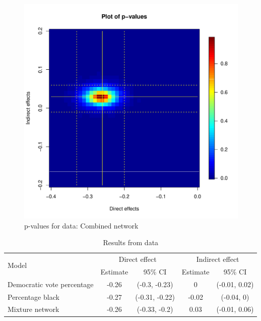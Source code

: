\documentclass[12pt]{article}
\begin{document}
\begin{figure}
\centering
\includegraphics[scale=0.45]{./images/pval_plot_broockman_demvotepct_blackpct.pdf}
\caption{p-values for \citet{broockman2013black} data: Combined network}
\end{figure}



\begin{table}[h]
\centering
\begin{tabular}{lcccc}
\toprule
\multirow{2}{*}{Model} & \multicolumn{2}{c}{Direct effect} & \multicolumn{2}{c}{Indirect effect} \\
\cmidrule(l){2-3} \cmidrule(l){4-5}
 & Estimate & 95\% CI & Estimate & 95\% CI \\
\midrule
Democratic vote percentage & -0.26 & (-0.3, -0.23) &  0 & (-0.01, 0.02)\\
Percentage black & -0.27 & (-0.31, -0.22) &  -0.02 & (-0.04, 0)\\
Mixture network & -0.26 & (-0.33, -0.2) &  0.03 & (-0.01, 0.06)\\
\bottomrule
\end{tabular}
\caption{Results from \citet{broockman2013black} data}
\end{table}
\end{document}

